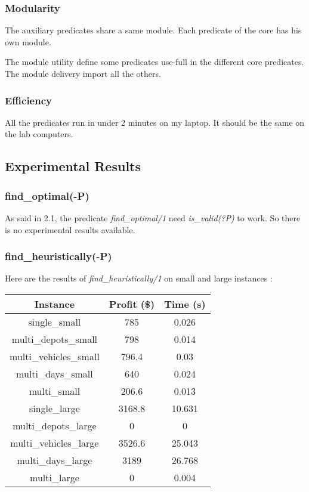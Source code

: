 \documentclass{article}
\begin{document}
\subsubsection{Modularity}

The auxiliary predicates share a same module. Each predicate of the core has his own module.

The module utility define some predicates use-full in the different core predicates. The module delivery import all the others.

\subsubsection{Efficiency}
All the predicates run in under 2 minutes on my laptop. It should be the same on the lab computers.



\subsection{Experimental Results}

\subsubsection{find\_optimal(-P)}
As said in 2.1, the predicate \textit{find\_optimal/1} need \textit{is\_valid(?P)} to work. So there is no experimental results available.

\subsubsection{find\_heuristically(-P)}

Here are the results of \textit{find\_heuristically/1} on small and large instances :

\begin{tabular}{|c|c|c|}
    \hline
     Instance & Profit (\$) & Time (s)  \\
     \hline
     single\_small & 785 & 0.026 \\
     multi\_depots\_small & 798 & 0.014 \\
     multi\_vehicles\_small & 796.4 & 0.03 \\
     multi\_days\_small & 640 & 0.024 \\
     multi\_small & 206.6 & 0.013 \\
     \hline
     single\_large & 3168.8 & 10.631 \\
     multi\_depots\_large & 0 & 0 \\
     multi\_vehicles\_large & 3526.6 & 25.043 \\
     multi\_days\_large & 3189 & 26.768 \\
     multi\_large & 0 & 0.004 \\
     \hline
\end{tabular}
\end{document}
